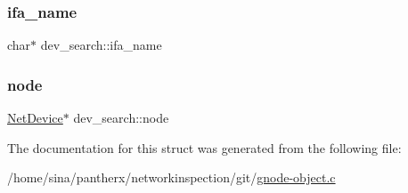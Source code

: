 \subsubsection{\texorpdfstring{ifa\+\_\+name}{ifa\_name}}
{\footnotesize\ttfamily char$\ast$ dev\+\_\+search\+::ifa\+\_\+name}

\mbox{\label{structdev__search_a758a734f7e35a194280148f6737a829d}} 
\subsubsection{\texorpdfstring{node}{node}}
{\footnotesize\ttfamily \hyperlink{gnode-object_8h_ab9c23d3a2ba4d9157b5ab053f61388dc}{Net\+Device}$\ast$ dev\+\_\+search\+::node}



The documentation for this struct was generated from the following file\+:\begin{DoxyCompactItemize}
\item 
/home/sina/pantherx/networkinspection/git/\hyperlink{gnode-object_8c}{gnode-\/object.\+c}\end{DoxyCompactItemize}
